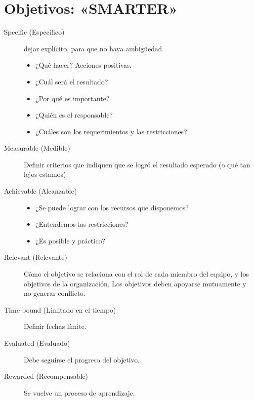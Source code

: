 \section*{Objetivos: «SMARTER»}
\begin{description}
	\item[Specific (Específico)] dejar explícito, para que no haya ambigüedad.
		\begin{itemize}\compresslist
			\item ¿Qué hacer? Acciones positivas.
			\item ¿Cuál será el resultado?
			\item ¿Por qué es importante?
			\item ¿Quién es el responsable?
			\item ¿Cuáles son los requerimientos y las restricciones?
		\end{itemize}
	\item[Measurable (Medible)]
	Definir criterios que indiquen que se logró el resultado esperado (o qué tan lejos estamos)
\item[Achievable (Alcanzable)]
	\begin{itemize}\compresslist
		\item ¿Se puede lograr con los recursos que disponemos?
		\item ¿Entendemos las restricciones?
		\item ¿Es posible y práctico?
	\end{itemize}
\item[Relevant (Relevante)]
	Cómo el objetivo se relaciona con el rol de cada miembro del equipo, y los objetivos de la organización.
	Los objetivos deben apoyarse mutuamente y no generar conflicto.
\item[Time-bound (Limitado en el tiempo)]
	Definir fechas límite.
\item[Evaluated (Evaluado)]
	Debe seguirse el progreso del objetivo.
\item[Rewarded (Recompensable)]
	Se vuelve un proceso de aprendizaje.
\end{description}
